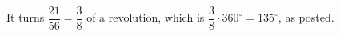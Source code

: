 It turns $\dfrac{21}{56}=\dfrac{3}{8}$ of a revolution, which is $\dfrac{3}{8}\cdot360^\circ=\boxed{135^\circ}$, as posted.
